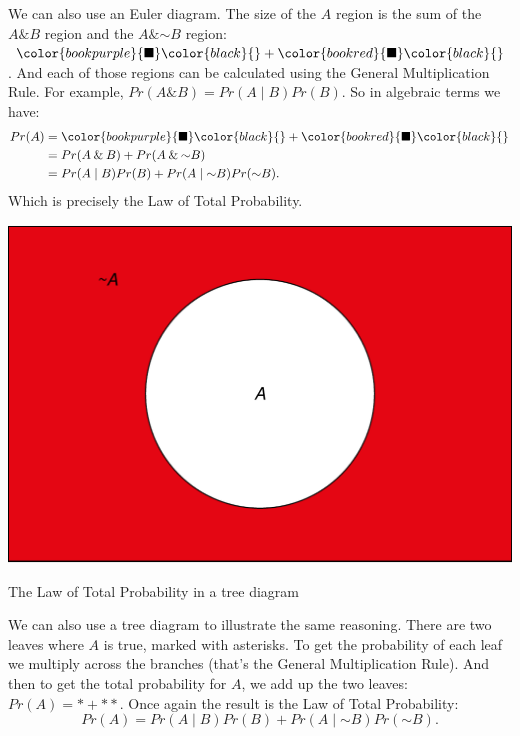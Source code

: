 \documentclass[justified]{tufte-book}
\newcommand{\given}{\mid}
\renewcommand{\neg}{\mathbin{\sim}}
\renewcommand{\wedge}{\mathbin{\&}}
\newcommand{\p}{Pr}
\theoremstyle{definition}
\theoremstyle{definition}
\theoremstyle{definition}
\theoremstyle{definition}
\theoremstyle{remark}
\begin{document}
We can also use an Euler diagram. The size of the \(A\) region is the sum of the \(A \wedge B\) region and the \(A \wedge \neg B\) region: \(\color{bookpurple}{\blacksquare}\color{black}{} + \color{bookred}{\blacksquare}\color{black}{}\). And each of those regions can be calculated using the General Multiplication Rule. For example, \(\p(A \wedge B) = \p(A \given B) \p(B)\). So in algebraic terms we have:
\[
  \begin{aligned}
    \p(A) &= \color{bookpurple}{\blacksquare}\color{black}{} 
             + \color{bookred}{\blacksquare}\color{black}{}\\
          &= \p(A \wedge B) + \p(A \wedge \neg B)\\
          &= \p(A \given B) \p(B) + \p(A \given \neg B) \p(\neg B).
  \end{aligned}
\]
Which is precisely the Law of Total Probability.

\begin{marginfigure}
\includegraphics{_main_files/figure-latex/unnamed-chunk-65-1} \caption[The Law of Total Probability in a tree diagram]{The Law of Total Probability in a tree diagram}\label{fig:unnamed-chunk-65}
\end{marginfigure}

We can also use a tree diagram to illustrate the same reasoning. There are two leaves where \(A\) is true, marked with asterisks. To get the probability of each leaf we multiply across the branches (that's the General Multiplication Rule). And then to get the total probability for \(A\), we add up the two leaves: \(\p(A) = * + **\). Once again the result is the Law of Total Probability:
\[
  \p(A) = \p(A \given B) \p(B) + \p(A \given \neg B) \p(\neg B).
\]
\end{document}
